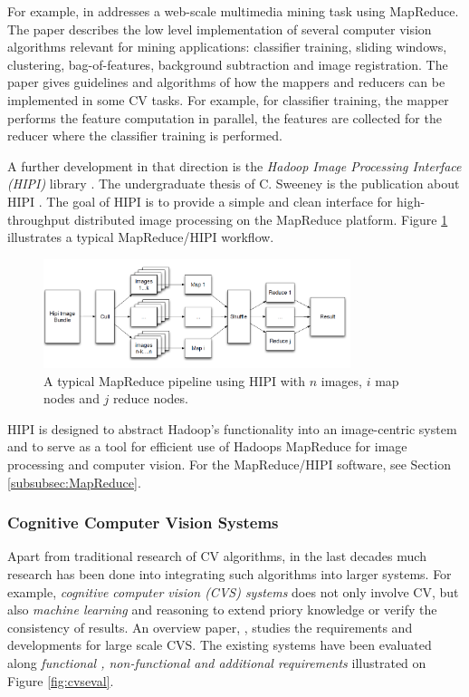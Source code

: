 For example, in \cite{White:2010} addresses a web-scale multimedia mining task using MapReduce. The paper describes the low level implementation of several computer vision algorithms relevant for mining applications: classifier training, sliding windows, clustering, bag-of-features, background subtraction and image registration.  The paper gives guidelines and algorithms of how the mappers and reducers can be implemented in some CV tasks. For example, for classifier training, the mapper performs the feature computation in parallel, the features are collected for the reducer where the classifier training is performed. 

A further development in that direction is the {\em Hadoop Image Processing Interface (HIPI)} library \cite{hipi_soft}. The undergraduate thesis of C. Sweeney is the publication about HIPI \cite{hipi_pub}. The goal of HIPI is to provide a simple and clean interface for high-throughput distributed image processing on the MapReduce platform. Figure \ref{fig:hipi} illustrates a typical MapReduce/HIPI workflow.

\begin{figure}[H]
\begin{center}
\includegraphics[width=0.8\textwidth]{fig/HIPI}
\end{center}
\caption{A typical MapReduce pipeline using HIPI with $n$ images, $i$ map nodes and $j$ reduce nodes.}
\label{fig:hipi}
\end{figure}
HIPI is designed to abstract Hadoop's functionality into an image-centric system and to serve as a tool for efficient use of Hadoops MapReduce for image processing and computer vision.
For the MapReduce/HIPI software, see Section \ref{subsubsec:MapReduce}.

\subsubsection{Cognitive Computer Vision Systems}
Apart from traditional research of CV algorithms, in the last decades much research has been done into integrating such algorithms into larger systems. For example, {\em cognitive computer vision (CVS) systems} does not only involve CV, but also {\em machine learning} and reasoning to extend priory knowledge or verify the consistency of results. An overview paper, \cite{WredeBSPV04}, studies the requirements and developments for large scale CVS. The existing systems have been evaluated along {\em functional , non-functional and additional requirements} illustrated on Figure \ref{fig:cvseval}.

